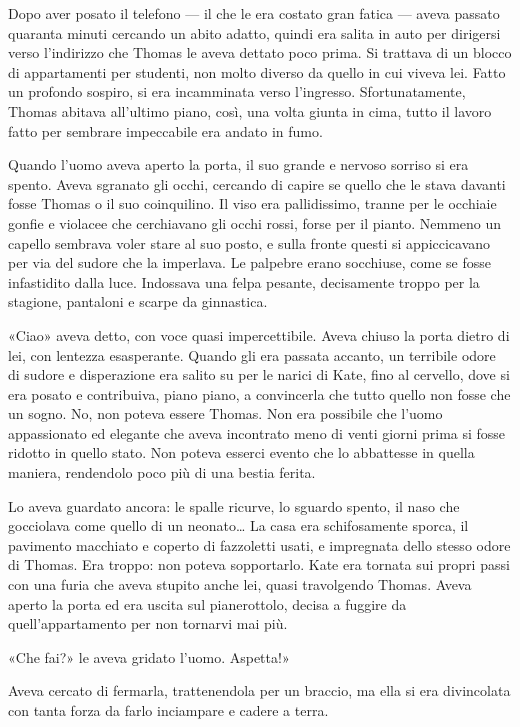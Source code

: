 \documentclass[a4paper,oneside,11pt]{memoir}
\begin{document}
Dopo aver posato il telefono --- il che le era costato gran fatica --- aveva
passato quaranta minuti cercando un abito adatto, quindi era salita in auto per
dirigersi verso l'indirizzo che Thomas le aveva dettato poco prima. Si trattava
di un blocco di appartamenti per studenti, non molto diverso da quello in cui
viveva lei. Fatto un profondo sospiro, si era incamminata verso l'ingresso.
Sfortunatamente, Thomas abitava all'ultimo piano, così, una volta giunta in
cima, tutto il lavoro fatto per sembrare impeccabile era andato in fumo.

Quando l'uomo aveva aperto la porta, il suo grande e nervoso sorriso si era
spento. Aveva sgranato gli occhi, cercando di capire se quello che le stava
davanti fosse Thomas o il suo coinquilino. Il viso era pallidissimo, tranne per
le occhiaie gonfie e violacee che cerchiavano gli occhi rossi, forse per il
pianto. Nemmeno un capello sembrava voler stare al suo posto, e sulla fronte
questi si appiccicavano per via del sudore che la imperlava. Le palpebre erano
socchiuse, come se fosse infastidito dalla luce. Indossava una felpa pesante,
decisamente troppo per la stagione, pantaloni e scarpe da ginnastica.

«Ciao» aveva detto, con voce quasi impercettibile. Aveva chiuso la porta dietro
di lei, con lentezza esasperante. Quando gli era passata accanto, un terribile
odore di sudore e disperazione era salito su per le narici di Kate, fino al
cervello, dove si era posato e contribuiva, piano piano, a convincerla che tutto
quello non fosse che un sogno. No, non poteva essere Thomas. Non era possibile
che l'uomo appassionato ed elegante che aveva incontrato meno di venti giorni
prima si fosse ridotto in quello stato. Non poteva esserci evento che lo
abbattesse in quella maniera, rendendolo poco più di una bestia ferita.

Lo aveva guardato ancora: le spalle ricurve, lo sguardo spento, il naso che
gocciolava come quello di un neonato\dots{} La casa era schifosamente sporca, il
pavimento macchiato e coperto di fazzoletti usati, e impregnata dello stesso
odore di Thomas. Era troppo: non poteva sopportarlo. Kate era tornata sui propri
passi con una furia che aveva stupito anche lei, quasi travolgendo Thomas. Aveva
aperto la porta ed era uscita sul pianerottolo, decisa a fuggire da
quell'appartamento per non tornarvi mai più.

«Che fai?» le aveva gridato l'uomo. Aspetta!»

Aveva cercato di fermarla, trattenendola per un braccio, ma ella si era
divincolata con tanta forza da farlo inciampare e cadere a terra.
\end{document}
